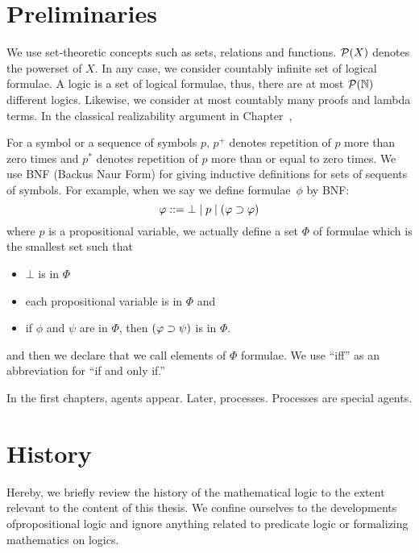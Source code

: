 \section{Preliminaries}

We use set-theoretic concepts such as sets, relations and functions.
  ${\mathcal P({X})}$ denotes the powerset of $X$.
  In any case, we consider countably infinite set of logical formulae.
  A logic is a set of logical formulae, thus, there are at most
  ${\mathcal P({\mathbb N})}$ different logics.
  Likewise, we consider at most countably many proofs and lambda terms.
  In the classical realizability argument in Chapter~\fix{},

  For a symbol or a sequence of symbols $p$,
  $p^+$ denotes repetition of $p$ more than zero times and
  $p^*$ denotes repetition of $p$ more than or equal to zero times.
  We use BNF (Backus Naur Form) for giving inductive definitions for sets
  of sequents of symbols.
  For example, when we say we define formulae~$\phi$ by BNF:
  \[
   \varphi::= \bot \mid p\mid (\varphi\supset\varphi)
  \]
  where $p$ is a propositional variable, we actually define a set $\Phi$
  of formulae which is the smallest set such that
  \begin{itemize}
   \item $\bot$ is in $\Phi$
   \item each propositional variable is in $\Phi$ and
   \item if $\phi$ and $\psi$ are in $\Phi$, then $(\varphi\supset\psi)$ is in $\Phi$.
  \end{itemize}
  and then we declare that we call elements of $\Phi$ formulae.
  We use ``iff'' as an abbreviation for ``if and only if.''

  In the first chapters, agents appear.  Later, processes.  Processes
  are special agents.





\section{History}

Hereby, we briefly review the history of the mathematical logic to the
extent relevant to the content of this thesis.
We confine ourselves to the developments ofpropositional logic and
ignore anything related to predicate logic or formalizing mathematics on
logics.

